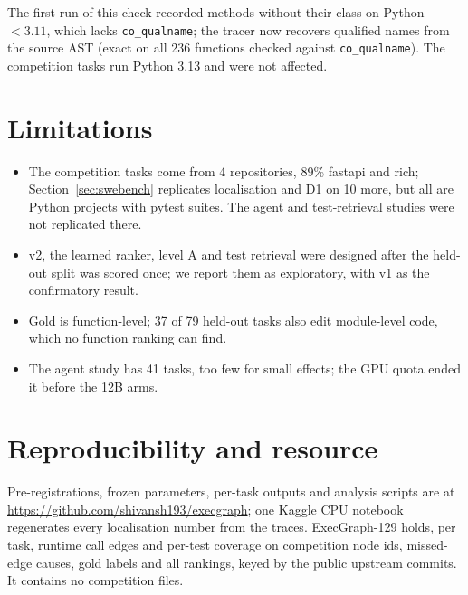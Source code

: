 \documentclass[10pt]{article}
\newcommand{\code}[1]{\texttt{#1}}
\begin{document}
The first run of this check recorded methods without their class on Python $<3.11$, which lacks
\code{co\_qualname}; the tracer now recovers qualified names from the source AST (exact on all 236 functions checked
against \code{co\_qualname}). The competition tasks run Python 3.13 and were not affected.

\section{Limitations}

\begin{itemize}
\item The competition tasks come from 4 repositories, 89\% fastapi and rich; Section~\ref{sec:swebench} replicates
localisation and D1 on 10 more, but all are Python projects with pytest suites. The agent and test-retrieval studies
were not replicated there.
\item v2, the learned ranker, level A and test retrieval were designed after the held-out split was scored once; we
report them as exploratory, with v1 as the confirmatory result.
\item Gold is function-level; 37 of 79 held-out tasks also edit module-level code, which no function ranking can find.
\item The agent study has 41 tasks, too few for small effects; the GPU quota ended it before the 12B arms.
\end{itemize}

\section{Reproducibility and resource}

Pre-registrations, frozen parameters, per-task outputs and analysis scripts are at \url{https://github.com/shivansh193/execgraph}; one Kaggle CPU
notebook regenerates every localisation number from the traces. ExecGraph-129 holds, per task, runtime call edges and
per-test coverage on competition node ids, missed-edge causes, gold labels and all rankings, keyed by the public
upstream commits. It contains no competition files.



\end{document}
